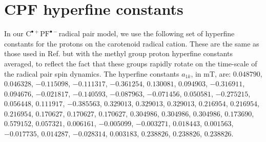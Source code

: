 \documentclass[%
aip,
jcp,%
amsmath,amssymb,
reprint%
]{revtex4-1}
\newcommand{\CPFrp}{$\text{C}^{\bullet +}\text{PF}^{\bullet-}$}
\begin{document}
\section{CPF hyperfine constants}\label{hfc-appendix}

In our \CPFrp radical pair model, we use the following set of hyperfine constants for the protons on the carotenoid radical cation. These are the same as those used in Ref.  but with the methyl group proton hyperfine constants averaged, to reflect the fact that these groups rapidly rotate on the time-scale of the radical pair spin dynamics. The hyperfine constants $a_{1k}$, in mT, are: $0.048790$, $0.046328$, $-0.115098$, $-0.111317$, $-0.361254$, $0.130081$, $0.094903$, $-0.316911$, $0.094676$, $-0.021817$, $-0.140593$, $-0.087963$, $-0.071456$, $0.050581$, $-0.275215$, $0.056448$, $0.111917$, $-0.385563$, $0.329013$, $0.329013$, $0.329013$, $0.216954$, $0.216954$, $0.216954$, $0.170627$, $0.170627$, $0.170627$, $0.304986$, $0.304986$, $0.304986$, $0.173690$, $0.579152$, $0.057321$, $0.006161$, $-0.005099$, $-0.003271$, $0.018443$, $0.001563$, $-0.017735$, $0.014287$, $-0.028314$, $0.003183$, $0.238826$, $0.238826$, $0.238826$.
\end{document}
